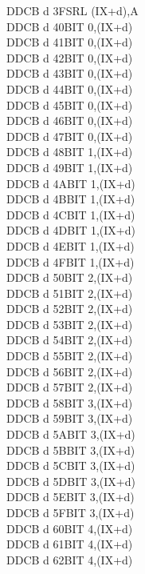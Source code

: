 \documentclass[12pt,twoside,openright,a4paper]{book}
\begin{document}
\begin{multicols}{3}
{\begin{tabbing}
	DDCB d 3F\>SRL (IX+d),A\UNDOC\\
	DDCB d 40\>BIT 0,(IX+d)\UNDOC\\
	DDCB d 41\>BIT 0,(IX+d)\UNDOC\\
	DDCB d 42\>BIT 0,(IX+d)\UNDOC\\
	DDCB d 43\>BIT 0,(IX+d)\UNDOC\\
	DDCB d 44\>BIT 0,(IX+d)\UNDOC\\
	DDCB d 45\>BIT 0,(IX+d)\UNDOC\\
	DDCB d 46\>BIT 0,(IX+d)\\
	DDCB d 47\>BIT 0,(IX+d)\UNDOC\\
	DDCB d 48\>BIT 1,(IX+d)\UNDOC\\
	DDCB d 49\>BIT 1,(IX+d)\UNDOC\\
	DDCB d 4A\>BIT 1,(IX+d)\UNDOC\\
	DDCB d 4B\>BIT 1,(IX+d)\UNDOC\\
	DDCB d 4C\>BIT 1,(IX+d)\UNDOC\\
	DDCB d 4D\>BIT 1,(IX+d)\UNDOC\\
	DDCB d 4E\>BIT 1,(IX+d)\\
	DDCB d 4F\>BIT 1,(IX+d)\UNDOC\\
	DDCB d 50\>BIT 2,(IX+d)\UNDOC\\
	DDCB d 51\>BIT 2,(IX+d)\UNDOC\\
	DDCB d 52\>BIT 2,(IX+d)\UNDOC\\
	DDCB d 53\>BIT 2,(IX+d)\UNDOC\\
	DDCB d 54\>BIT 2,(IX+d)\UNDOC\\
	DDCB d 55\>BIT 2,(IX+d)\UNDOC\\
	DDCB d 56\>BIT 2,(IX+d)\\
	DDCB d 57\>BIT 2,(IX+d)\UNDOC\\
	DDCB d 58\>BIT 3,(IX+d)\UNDOC\\
	DDCB d 59\>BIT 3,(IX+d)\UNDOC\\
	DDCB d 5A\>BIT 3,(IX+d)\UNDOC\\
	DDCB d 5B\>BIT 3,(IX+d)\UNDOC\\
	DDCB d 5C\>BIT 3,(IX+d)\UNDOC\\
	DDCB d 5D\>BIT 3,(IX+d)\UNDOC\\
	DDCB d 5E\>BIT 3,(IX+d)\\
	DDCB d 5F\>BIT 3,(IX+d)\UNDOC\\
	DDCB d 60\>BIT 4,(IX+d)\UNDOC\\
	DDCB d 61\>BIT 4,(IX+d)\UNDOC\\
	DDCB d 62\>BIT 4,(IX+d)\UNDOC\\

\end{tabbing}}
\end{multicols}
\end{document}

